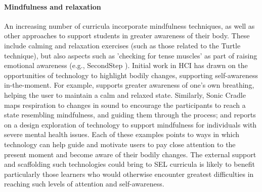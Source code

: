 \documentclass[prodmode,acmtochi]{acmsmall}
\begin{document}
%





\paragraph{Mindfulness and relaxation}
An increasing number of curricula incorporate mindfulness techniques, as well as other approaches to support students in greater awareness of their body. These include calming and relaxation exercises (such as those related to the Turtle technique), but also aspects such as 'checking for tense muscles' as part of raising emotional awareness (e.g., SecondStep \cite{Webster-Stratton2004}). Initial work in HCI has drawn on the opportunities of technology to highlight bodily changes, supporting self-awareness in-the-moment. For example,  supports greater awareness of one's own breathing, helping the user to maintain a calm and relaxed state. 
Similarly, Sonic Cradle maps respiration to changes in sound to encourage the participants to reach a state resembling mindfulness, and guiding them through the process; and  reports on a design exploration of technology to support mindfulness for individuals with severe mental health issues. Each of these examples points to ways in which technology can help guide and motivate users to pay close attention to the present moment and become aware of their bodily changes. The external support and scaffolding such technologies could bring to SEL curricula is likely to benefit particularly those learners who would otherwise encounter greatest difficulties in reaching such levels of attention and self-awareness. 


\end{document}
